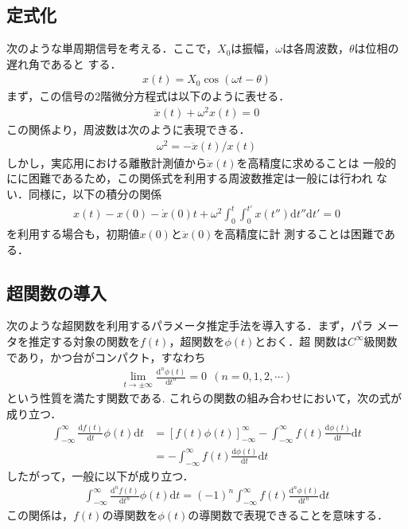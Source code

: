 \documentclass[a4paper,12pt]{jarticle}
\begin{document}
\subsection{定式化}
次のような単周期信号を考える．ここで，$X_0$は振幅，$\omega$は各周波数，$\theta$は位相の遅れ角であると
する．
\begin{align}
 x(t)=X_0\cos(\omega t- \theta)\label{1}
\end{align}
%
まず，この信号の2階微分方程式は以下のように表せる．
\begin{align}
 \ddot{x}(t)+\omega^2x(t)=0\label{2}
\end{align}
この関係より，周波数は次のように表現できる．
\begin{align}
 \omega^2=-\ddot{x}(t)/x(t)\label{3}
\end{align}
しかし，実応用における離散計測値から$\ddot{x}(t)$を高精度に求めることは
一般的にに困難であるため，この関係式を利用する周波数推定は一般には行われ
ない．同様に，以下の積分の関係
\begin{align}
x(t)-x(0)-\dot{x}(0)t+\omega^2\int^t_0\int^{t'}_0x(t'') \mbox{d}t''\mbox{d}t'=0\label{4}
\end{align}
を利用する場合も，初期値${x}(0)$と$\ddot{x}(0)$を高精度に計
測することは困難である．
\subsection{超関数の導入}
次のような超関数を利用するパラメータ推定手法を導入する．まず，パラ
メータを推定する対象の関数を$f(t)$，超関数を$\phi(t)$とおく．超
関数は$C^{\infty}$級関数であり，かつ台がコンパクト，すなわち
\begin{align}
 \lim_{t\to \pm \infty}\frac{\mbox{d}^n\phi(t)}{\mbox{d}t^n} = 0\ \ (n=0,1,2,\cdots)\label{5}
\end{align}
という性質を満たす関数である\cite{distributions}.
これらの関数の組み合わせにおいて，次の式が成り立つ．
\begin{align}
 \int_{-\infty}^{\infty} \frac{\mbox{d} f(t)}{\mbox{d}t}
 \phi(t)\mbox{d}t 
 &=\left[f(t)\phi(t) \right]_{-\infty}^{\infty} -\int_{-\infty}^{\infty}
 f(t) \frac{\mbox{d} \phi(t)}{\mbox{d}t}
 \mbox{d}t\nonumber\\
 &=-\int_{-\infty}^{\infty} f(t) \frac{\mbox{d} \phi(t)}{\mbox{d}t} \mbox{d}t\label{6}
\end{align}
したがって，一般に以下が成り立つ．
\begin{align}
 \int_{-\infty}^{\infty} \frac{\mbox{d}^n f(t)}{\mbox{d}t^n}
 \phi(t)\mbox{d}t
 = (-1)^n  \int_{-\infty}^{\infty} f(t) \frac{\mbox{d}^n \phi(t)}{\mbox{d}t^n}
 \mbox{d}t\label{7}
\end{align}
この関係は，$f(t)$の導関数を$\phi(t)$の導関数で表現できることを意味する．
\end{document}
